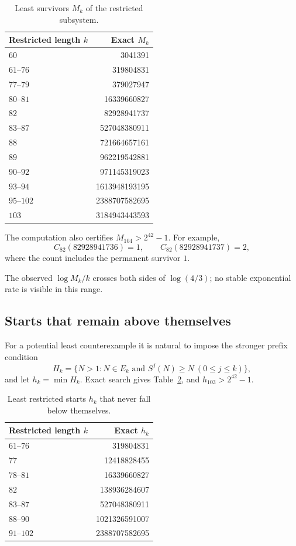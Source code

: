 \documentclass[11pt,reqno]{amsart}
\theoremstyle{plain}
\theoremstyle{definition}
\numberwithin{equation}{section}
\begin{document}
\begin{table}[htbp]
\centering
\caption{Least survivors $M_k$ of the restricted subsystem.}
\label{tab:Mk}
\begin{tabular}{@{}lr@{}}
\toprule
Restricted length $k$ & Exact $M_k$\\
\midrule
$60$        & \num{3041391}\\
$61$--$76$  & \num{319804831}\\
$77$--$79$  & \num{379027947}\\
$80$--$81$  & \num{16339660827}\\
$82$        & \num{82928941737}\\
$83$--$87$  & \num{527048380911}\\
$88$        & \num{721664657161}\\
$89$        & \num{962219542881}\\
$90$--$92$  & \num{971145319023}\\
$93$--$94$  & \num{1613948193195}\\
$95$--$102$ & \num{2388707582695}\\
$103$       & \num{3184943443593}\\
\bottomrule
\end{tabular}
\end{table}

The computation also certifies $M_{104}>2^{42}-1$.  For example,
\[
C_{82}(\num{82928941736})=1,
\qquad
C_{82}(\num{82928941737})=2,
\]
where the count includes the permanent survivor $1$.

The observed $\log M_k/k$ crosses both sides of $\log(4/3)$; no stable
exponential rate is visible in this range.

\subsection{Starts that remain above themselves}

For a potential least counterexample it is natural to impose the stronger
prefix condition
\[
H_k=
\{N>1:N\in E_k\text{ and }S^j(N)\ge N\ (0\le j\le k)\},
\]
and let $h_k=\min H_k$.  Exact search gives Table~\ref{tab:hk}, and
$h_{103}>2^{42}-1$.

\begin{table}[htbp]
\centering
\caption{Least restricted starts $h_k$ that never fall below themselves.}
\label{tab:hk}
\begin{tabular}{@{}lr@{}}
\toprule
Restricted length $k$ & Exact $h_k$\\
\midrule
$61$--$76$  & \num{319804831}\\
$77$        & \num{12418828455}\\
$78$--$81$  & \num{16339660827}\\
$82$        & \num{138936284607}\\
$83$--$87$  & \num{527048380911}\\
$88$--$90$  & \num{1021326591007}\\
$91$--$102$ & \num{2388707582695}\\
\bottomrule
\end{tabular}
\end{table}
\end{document}
